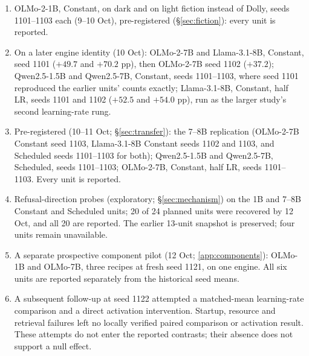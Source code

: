 \documentclass[11pt]{article}
\begin{document}
\begin{enumerate}
        complete three seeds: $+39.5$ and $+42.5$ pp.
  \item OLMo-2-1B, Constant, on dark and on light fiction instead of Dolly,
        seeds 1101--1103 each (9--10 Oct), pre-registered
        (\S\ref{sec:fiction}): every unit is reported.
  \item On a later engine identity (10 Oct): OLMo-2-7B and Llama-3.1-8B,
        Constant, seed 1101 ($+49.7$ and $+70.2$ pp), then OLMo-2-7B seed 1102
        ($+37.2$); Qwen2.5-1.5B and Qwen2.5-7B, Constant, seeds 1101--1103,
        where seed 1101 reproduced the earlier units' counts exactly;
        Llama-3.1-8B, Constant, half LR, seeds 1101 and 1102 ($+52.5$ and
        $+54.0$ pp), run as the larger study's second learning-rate rung.
  \item Pre-registered (10--11 Oct; \S\ref{sec:transfer}): the 7--8B
        replication (OLMo-2-7B Constant seed 1103, Llama-3.1-8B Constant seeds
        1102 and 1103, and Scheduled seeds 1101--1103 for both); Qwen2.5-1.5B
        and Qwen2.5-7B, Scheduled, seeds 1101--1103; OLMo-2-7B, Constant, half
        LR, seeds 1101--1103. Every unit is reported.
  \item Refusal-direction probes (exploratory; \S\ref{sec:mechanism}) on the
        1B and 7--8B Constant and Scheduled units; 20 of 24 planned units
        were recovered by 12 Oct, and all 20 are reported. The earlier 13-unit
        snapshot is preserved; four units remain unavailable.
  \item A separate prospective component pilot (12 Oct; \cref{app:components}):
        OLMo-1B and OLMo-7B, three recipes at fresh seed 1121, on one engine.
        All six units are reported separately from the historical seed means.
  \item A subsequent follow-up at seed 1122 attempted a matched-mean
        learning-rate comparison and a direct activation intervention.
        Startup, resource and retrieval failures left no locally verified
        paired comparison or activation result. These attempts do not enter
        the reported contrasts; their absence does not support a null effect.
\end{enumerate}
\end{document}
